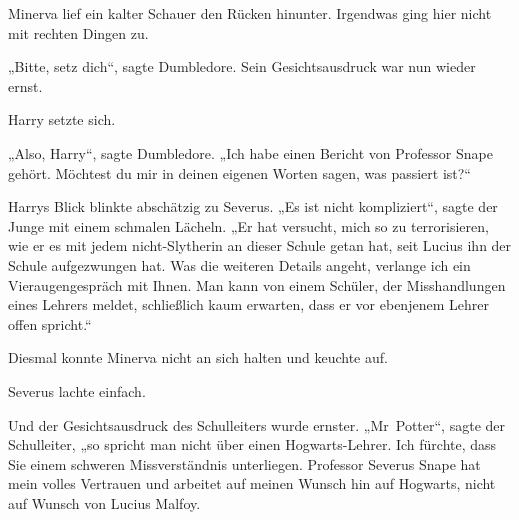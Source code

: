 Minerva lief ein kalter Schauer den Rücken hinunter. Irgendwas ging hier nicht mit rechten Dingen zu. 

„Bitte, setz dich“, sagte Dumbledore. Sein Gesichtsausdruck war nun wieder ernst. 

Harry setzte sich. 

„Also, Harry“, sagte Dumbledore. „Ich habe einen Bericht von Professor Snape gehört. Möchtest du mir in deinen eigenen Worten sagen, was passiert ist?“ 

Harrys Blick blinkte abschätzig zu Severus. „Es ist nicht kompliziert“, sagte der Junge mit einem schmalen Lächeln. „Er hat versucht, mich so zu terrorisieren, wie er es mit jedem nicht-Slytherin an dieser Schule getan hat, seit Lucius ihn der Schule aufgezwungen hat. Was die weiteren Details angeht, verlange ich ein Vieraugengespräch mit Ihnen. Man kann von einem Schüler, der Misshandlungen eines Lehrers meldet, schließlich kaum erwarten, dass er vor ebenjenem Lehrer offen spricht.“ 

Diesmal konnte Minerva nicht an sich halten und keuchte auf. 

Severus lachte einfach. 

Und der Gesichtsausdruck des Schulleiters wurde ernster. „Mr~Potter“, sagte der Schulleiter, „so spricht man nicht über einen Hogwarts-Lehrer. Ich fürchte, dass Sie einem schweren Missverständnis unterliegen. Professor Severus Snape hat mein volles Vertrauen und arbeitet auf meinen Wunsch hin auf Hogwarts, nicht auf Wunsch von Lucius Malfoy. 

